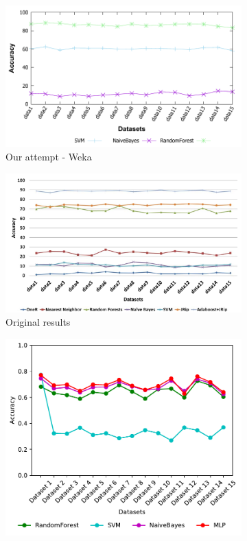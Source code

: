 \begin{figure}[H]
    \centering
    \begin{subfigure}[t]{110mm}
        \includegraphics[width=\linewidth]{images/weka_accuracyall}
        \caption{Our attempt - Weka}
    \end{subfigure}
    \begin{subfigure}[t]{110mm}
        \includegraphics[width=\linewidth]{images/weka_accuracyall_cite.png}
        \caption{Original results \cite{borges_hink_machine_2014-1}}
    \end{subfigure}
    \begin{subfigure}[t]{110mm}
        \includegraphics[width=\linewidth, page = 3]{images/accuracy}

\end{subfigure}
\end{figure}
